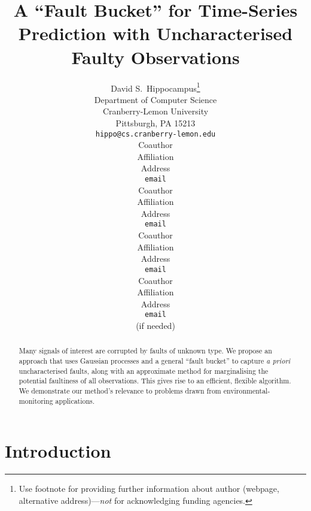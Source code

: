 \documentclass{article} %
\title{A ``Fault Bucket'' for Time-Series Prediction with
    Uncharacterised Faulty Observations}
\begin{document}
\maketitle

\author{
David S.~Hippocampus\thanks{ Use footnote for providing further information
about author (webpage, alternative address)---\emph{not} for acknowledging
funding agencies.} \\
Department of Computer Science\\
Cranberry-Lemon University\\
Pittsburgh, PA 15213 \\
\texttt{hippo@cs.cranberry-lemon.edu} \\
\And
Coauthor \\
Affiliation \\
Address \\
\texttt{email} \\
\AND
Coauthor \\
Affiliation \\
Address \\
\texttt{email} \\
\And
Coauthor \\
Affiliation \\
Address \\
\texttt{email} \\
\And
Coauthor \\
Affiliation \\
Address \\
\texttt{email} \\
(if needed)\\
}

\begin{abstract}
Many signals of interest are corrupted by faults of unknown type. We propose an approach that uses Gaussian processes and a general ``fault bucket'' to capture \textit{a priori} uncharacterised faults, along with an approximate method for marginalising the potential faultiness of all observations. This gives rise to an
  efficient, flexible algorithm. We demonstrate our method's relevance
  to problems drawn from environmental-monitoring
  applications.
\end{abstract}

\section{Introduction}
\end{document}

